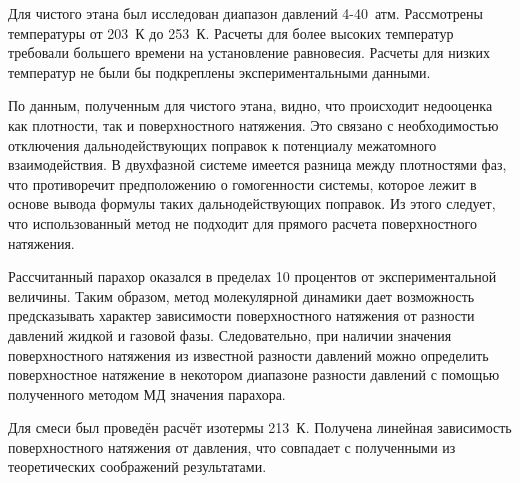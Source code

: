 Для чистого этана был исследован диапазон давлений 4-40~атм. Рассмотрены температуры от 203~К до 253~К. Расчеты для более высоких температур требовали большего времени на установление равновесия. Расчеты для низких температур не были бы подкреплены экспериментальными данными. 

По данным, полученным для чистого этана, видно, что происходит недооценка как плотности, так и поверхностного натяжения. Это связано с необходимостью отключения дальнодействующих поправок к потенциалу межатомного взаимодействия. В двухфазной системе имеется разница между плотностями фаз, что противоречит предположению о гомогенности системы, которое лежит в основе вывода формулы таких дальнодействующих поправок. Из этого следует, что использованный метод не подходит для прямого расчета поверхностного натяжения.

Рассчитанный парахор оказался в пределах 10 процентов от экспериментальной величины. Таким образом, метод молекулярной динамики дает возможность предсказывать характер зависимости поверхностного натяжения от разности давлений жидкой и газовой фазы. Следовательно, при наличии значения поверхностного натяжения из известной разности давлений можно определить поверхностное натяжение в некотором диапазоне разности давлений с помощью полученного методом МД значения парахора. 

Для смеси был проведён расчёт изотермы 213~К. Получена линейная зависимость поверхностного натяжения от давления, что совпадает с полученными из теоретических соображений результатами. 
